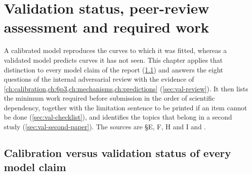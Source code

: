 \chapter{Validation status, peer-review assessment and required work}\label{ch:validation}

A calibrated model reproduces the curves to which it was fitted, whereas a validated model predicts curves it has not seen. This chapter applies that distinction to every model claim of the report (\cref{sec:val-status}) and answers the eight questions of the internal adversarial review with the evidence of \cref{ch:calibration,ch:6p3,ch:mechanisms,ch:predictions} (\cref{sec:val-review}). It then lists the minimum work required before submission in the order of scientific dependency, together with the limitation sentence to be printed if an item cannot be done (\cref{sec:val-checklist}), and identifies the topics that belong in a second study (\cref{sec:val-second-paper}). The sources are  \S E, F, H and I and .

\section{Calibration versus validation status of every model claim}\label{sec:val-status}

